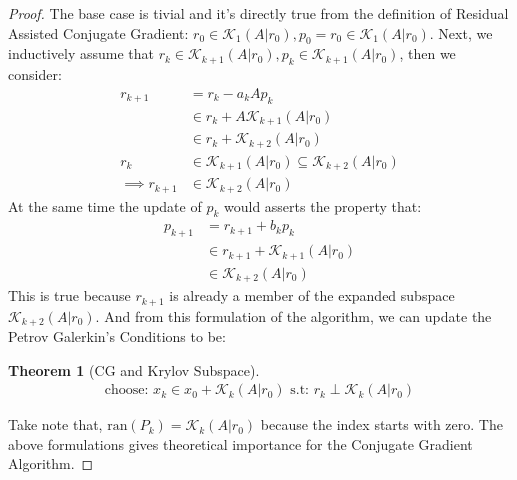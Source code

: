 \documentclass[]{article}
\theoremstyle{definition}
\newtheorem{theorem}{Theorem}            %
\begin{document}
            \begin{proof}
                The base case is tivial and it's directly true from the definition of Residual Assisted Conjugate Gradient: $r_0 \in \mathcal K_1(A|r_0), p_0 = r_0 \in \mathcal K_1(A|r_0)$. Next, we inductively assume that $r_k \in \mathcal K_{k + 1}(A|r_0), p_k \in \mathcal K_{k + 1}(A|r_0)$, then we consider: 
                \begin{align}
                    r_{k + 1} &= r_k - a_kAp_k
                    \\
                    &\in r_k + A\mathcal K_{k + 1}(A|r_0)
                    \\
                    &\in r_k + \mathcal K_{k + 2}(A|r_0)
                    \\
                    r_k 
                    &\in 
                    \mathcal K_{k + 1}(A|r_0) \subseteq \mathcal K_{k + 2}(A|r_0)
                    \\
                    \implies r_{k + 1}
                    &\in 
                    \mathcal K_{k + 2}(A|r_0)
                \end{align}
                At the same time the update of $p_k$ would asserts the property that: 
                \begin{align}
                    p_{k + 1} &= r_{k + 1} + b_kp_k
                    \\
                    &\in 
                    r_{k + 1} + \mathcal K_{k + 1}(A|r_0)
                    \\
                    &\in \mathcal K_{k + 2}(A|r_0)
                \end{align}
                This is true because $r_{k + 1}$ is already a member of the expanded subspace $\mathcal K_{k + 2}(A|r_0)$. And from this formulation of the algorithm, we can update the Petrov Galerkin's Conditions to be: 
                \begin{theorem}[CG and Krylov Subspace]\label{theorem:CG_and_Krylov_Subspace}
                    \begin{align}
                        \text{choose: } x_k\in x_0 + \mathcal K_{k}(A|r_0) \text{ s.t: } r_k \perp \mathcal K_{k}(A|r_0)
                    \end{align}    
                \end{theorem}
                Take note that, $\text{ran}(P_k) = \mathcal K_k(A|r_0)$ because the index starts with zero. The above formulations gives theoretical importance for the Conjugate Gradient Algorithm. 
            \end{proof}
\end{document}
